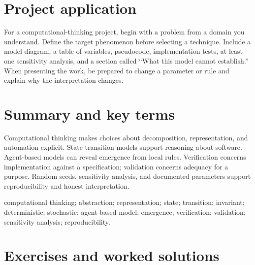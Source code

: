 \section{Project application}
For a computational-thinking project, begin with a problem from a domain you understand. Define the target phenomenon before selecting a technique. Include a model diagram, a table of variables, pseudocode, implementation tests, at least one sensitivity analysis, and a section called \enquote{What this model cannot establish.} When presenting the work, be prepared to change a parameter or rule and explain why the interpretation changes.

\section{Summary and key terms}
Computational thinking makes choices about decomposition, representation, and automation explicit. State-transition models support reasoning about software. Agent-based models can reveal emergence from local rules. Verification concerns implementation against a specification; validation concerns adequacy for a purpose. Random seeds, sensitivity analysis, and documented parameters support reproducibility and honest interpretation.

\begin{keyterms}computational thinking; abstraction; representation; state; transition; invariant; deterministic; stochastic; agent-based model; emergence; verification; validation; sensitivity analysis; reproducibility.\end{keyterms}

\section{Exercises and worked solutions}


